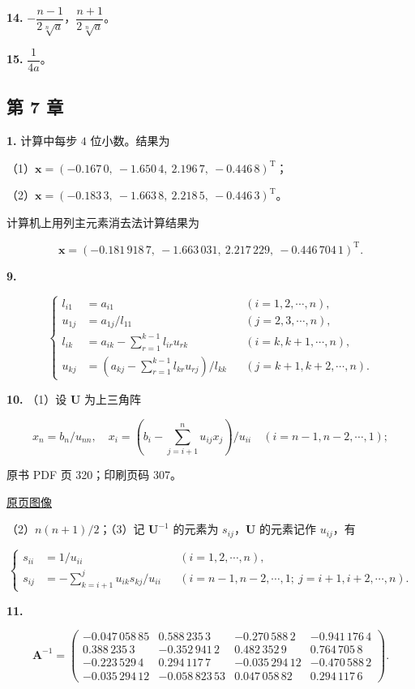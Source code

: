 \textbf{14.} \(-\dfrac{n-1}{2\sqrt[n]{a}}\)，\(\dfrac{n+1}{2\sqrt[n]{a}}\)。

\textbf{15.} \(\dfrac{1}{4a}\)。

\subsection{第 7 章}\label{back-ux7b2c-7-ux7ae0}

\textbf{1.} 计算中每步 \(4\) 位小数。结果为

（1）\(\boldsymbol{x}=(-0.167\,0,\ -1.650\,4,\ 2.196\,7,\ -0.446\,8)^{\mathrm{T}}\)；

（2）\(\boldsymbol{x}=(-0.183\,3,\ -1.663\,8,\ 2.218\,5,\ -0.446\,3)^{\mathrm{T}}\)。

计算机上用列主元素消去法计算结果为

\[
\boldsymbol{x}=(-0.181\,918\,7,\ -1.663\,031,\ 2.217\,229,\ -0.446\,704\,1)^{\mathrm{T}}.
\]

\textbf{9.}

\[
\left\{
\begin{aligned}
l_{i1}&=a_{i1} &&(i=1,2,\cdots,n),\\
u_{1j}&=a_{1j}/l_{11} &&(j=2,3,\cdots,n),\\
l_{ik}&=a_{ik}-\sum_{r=1}^{k-1}l_{ir}u_{rk} &&(i=k,k+1,\cdots,n),\\
u_{kj}&=\left(a_{kj}-\sum_{r=1}^{k-1}l_{kr}u_{rj}\right)/l_{kk} &&(j=k+1,k+2,\cdots,n).
\end{aligned}
\right.
\]

\textbf{10.} （1）设 \(\boldsymbol{U}\) 为上三角阵

\[
x_n=b_n/u_{nn},\quad
x_i=\left(b_i-\sum_{j=i+1}^{n}u_{ij}x_j\right)/u_{ii}
\quad(i=n-1,n-2,\cdots,1);
\]

\clearpage

原书 PDF 页 320；印刷页码 307。

\href{source-images/pdf-320.jpeg}{原页图像}

（2）\(n(n+1)/2\)；（3）记 \(\boldsymbol{U}^{-1}\) 的元素为 \(s_{ij}\)，\(\boldsymbol{U}\) 的元素记作 \(u_{ij}\)，有

\[
\left\{
\begin{aligned}
s_{ii}&=1/u_{ii} &&(i=1,2,\cdots,n),\\
s_{ij}&=-\sum_{k=i+1}^{j}u_{ik}s_{kj}/u_{ii}
&&(i=n-1,n-2,\cdots,1;\ j=i+1,i+2,\cdots,n).
\end{aligned}
\right.
\]

\textbf{11.}

\[
\boldsymbol{A}^{-1}=
\begin{pmatrix}
-0.047\,058\,85 & 0.588\,235\,3 & -0.270\,588\,2 & -0.941\,176\,4\\
0.388\,235\,3 & -0.352\,941\,2 & 0.482\,352\,9 & 0.764\,705\,8\\
-0.223\,529\,4 & 0.294\,117\,7 & -0.035\,294\,12 & -0.470\,588\,2\\
-0.035\,294\,12 & -0.058\,823\,53 & 0.047\,058\,82 & 0.294\,117\,6
\end{pmatrix}.
\]

